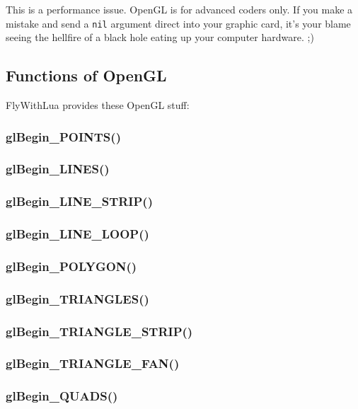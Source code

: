 \documentclass[11pt,parskip=half,a4paper]{scrartcl}
\begin{document}
This is a performance issue. OpenGL is for advanced coders only. If you make a mistake and send a \verb|nil| argument direct into your graphic card, it's your blame seeing the hellfire of a black hole eating up your computer hardware. ;)

\subsection{Functions of OpenGL}

FlyWithLua provides these OpenGL stuff:

\subsubsection{glBegin\_POINTS()}

\subsubsection{glBegin\_LINES()}

\subsubsection{glBegin\_LINE\_STRIP()}

\subsubsection{glBegin\_LINE\_LOOP()}

\subsubsection{glBegin\_POLYGON()}

\subsubsection{glBegin\_TRIANGLES()}

\subsubsection{glBegin\_TRIANGLE\_STRIP()}

\subsubsection{glBegin\_TRIANGLE\_FAN()}

\subsubsection{glBegin\_QUADS()}
\end{document}
